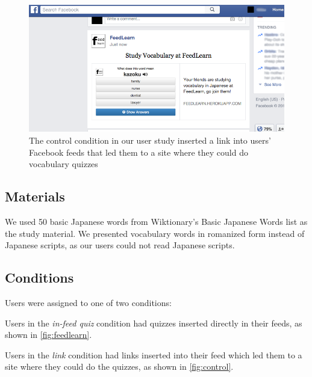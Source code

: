 \documentclass{sigchi}
\begin{document}
\begin{figure}
\centering
\includegraphics[width=1.0\columnwidth]{feedlearn-link-screenshot}
\caption{The control condition in our user study inserted a link into users' Facebook feeds that led them to a site where they could do vocabulary quizzes}
\label{fig:control}
\end{figure}

\subsection{Materials}

We used 50 basic Japanese words from Wiktionary's Basic Japanese Words list as the study material. We presented vocabulary words in romanized form instead of Japanese scripts, as our users could not read Japanese scripts.


\subsection{Conditions}

Users were assigned to one of two conditions:

\begin{compactitem}
\item Users in the \textit{in-feed quiz} condition had quizzes inserted directly in their feeds, as shown in \autoref{fig:feedlearn}.
\item Users in the \textit{link} condition had links inserted into their feed which led them to a site where they could do the quizzes, as shown in \autoref{fig:control}.
\end{compactitem}
\end{document}
